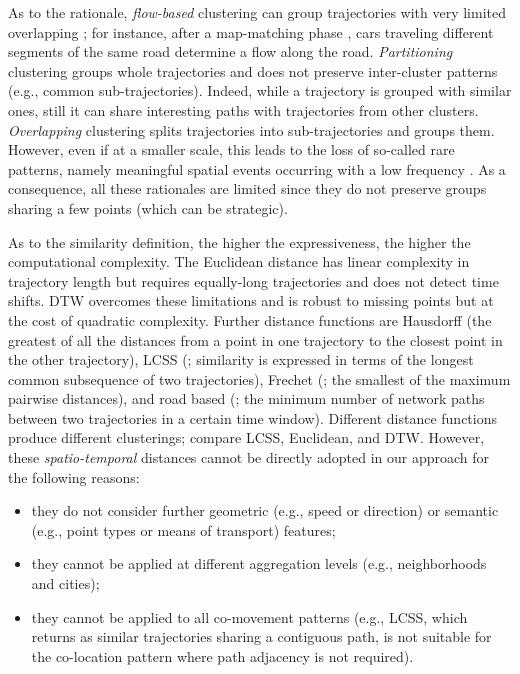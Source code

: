 \documentclass[preprint,12pt,authoryear]{elsarticle} %
\begin{document}
As to the rationale, \textit{flow-based} clustering can group trajectories with very limited overlapping \citep{DBLP:conf/icdcs/HanLO12,DBLP:journals/tmc/HanLO15}; for instance, after a map-matching phase \citep{DBLP:conf/mipro/FranciaGV19}, cars traveling different segments of the same road determine a flow along the road.
\textit{Partitioning} clustering groups whole trajectories \citep{DBLP:journals/tkde/HanLO17,DBLP:journals/tits/KumarWRLKP18,DBLP:journals/pvldb/WangBCSQ19} and does not preserve inter-cluster patterns (e.g., common sub-trajectories).
Indeed, while a trajectory is grouped with similar ones, still it can share interesting paths with trajectories from other clusters.
\textit{Overlapping} clustering \citep{DBLP:conf/sigmod/LeeHW07,tampakis2019scalable,ailin2019movement} splits trajectories into sub-trajectories and groups them.
However, even if at a smaller scale, this leads to the loss of so-called rare patterns, namely meaningful spatial events occurring with a low frequency \citep{DBLP:journals/tkdd/KohR16}.
As a consequence, all these rationales are limited since they do not preserve groups sharing a few points (which can be strategic).

As to the similarity definition, the higher the expressiveness, the higher the computational complexity.
The Euclidean distance \citep{van1995some} has linear complexity in trajectory length but requires equally-long trajectories and does not detect time shifts. 
DTW \citep{DBLP:conf/kdd/RakthanmanonCMBWZZK12} overcomes these limitations and is robust to missing points but at the cost of quadratic complexity.
Further distance functions are Hausdorff \citep{DBLP:journals/tip/SimKP99} (the greatest of all the distances from a point in one trajectory to the closest point in the other trajectory), LCSS (\cite{DBLP:conf/icde/VlachosGK02}; similarity is expressed in terms of the longest common subsequence of two trajectories), Frechet (\cite{DBLP:conf/pods/AgarwalFMNPT18}; the smallest of the maximum pairwise distances), and road based (\cite{DBLP:conf/mdm/SilvaLMZC20}; the minimum number of network paths between two trajectories in a certain time window).
Different distance functions produce different clusterings; \cite{DBLP:conf/icde/VlachosGK02} compare LCSS, Euclidean, and DTW.
However, these \textit{spatio-temporal} distances cannot be directly adopted in our approach for the following reasons:
\begin{itemize}
\item they do not consider further geometric (e.g., speed or direction) or semantic (e.g., point types or means of transport) features;
\item they cannot be applied at different aggregation levels (e.g., neighborhoods and cities);
\item they cannot be applied to all co-movement patterns (e.g., LCSS, which returns as similar trajectories sharing a contiguous path, is not suitable for the co-location pattern where path adjacency is not required).
\end{itemize}
\end{document}
